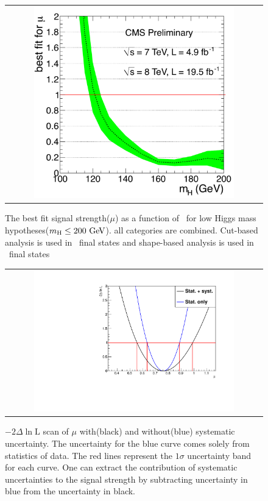 %
\begin{figure}[htp] 
\centering 
\begin{tabular}{c} 
\includegraphics[width=0.8\textwidth]{figures/mlf7p8TeV_zoomed.pdf}
\end{tabular} 
\caption{The best fit signal strength($\mu$) as a function of \mHi\ for low Higgs 
mass hypotheses($m_{\mathrm{H}}\le200~\mathrm{Ge\kern -0.1em V}$).
all categories are combined. 
Cut-based analysis is used in \SF\ final states 
and shape-based analysis is used in \DF\ final states} 
\label{fig:mu_mH} 
\end{figure} 

%
\begin{figure}[htp] 
\centering 
\begin{tabular}{c} 
\includegraphics[width=0.8\textwidth]{figures/MuDeltaNLL.pdf}
\end{tabular} 
\caption{ $- 2\Delta\ln \textrm{L}$ scan of $\mu$ with(black) 
and without(blue) systematic uncertainty.
The uncertainty for the blue curve comes solely from statistics of data.
The red lines represent the $1\sigma$ uncertainty band for each curve. 
One can extract the contribution of systematic uncertainties to the signal strength
by subtracting uncertainty in blue from the uncertainty in black.} 
\label{fig:mu_scan} 
\end{figure} 

